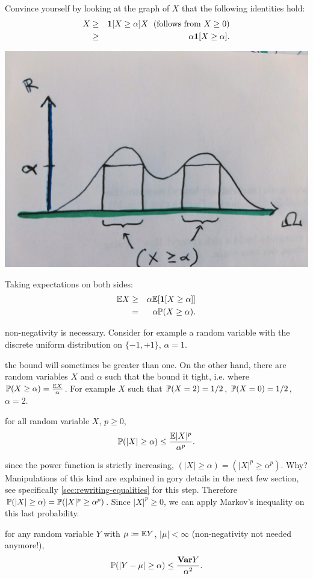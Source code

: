 \documentclass{article}
\begin{document}
 Convince yourself by looking at the graph of $X$ that the following identities hold: 
\begin{eqnarray*} 
X &\ge& \1[X \ge \alpha] X\;\text{ (follows from }X \ge 0\text{)} \\
&\ge& \alpha \1[X \ge \alpha].
\end{eqnarray*}
\begin{center}
	\includegraphics[width=0.5\linewidth]{figures/markov}
\end{center}
Taking expectations on both sides:
\begin{eqnarray*}
\E X &\ge& \alpha \E[\1[X \ge \alpha]] \\
&=& \alpha \P(X \ge \alpha).
\end{eqnarray*}

 non-negativity is necessary. Consider for example a random variable with the discrete uniform distribution on $\{-1, +1\}$, $\alpha = 1$.  

 the bound will sometimes be greater than one. On the other hand, there are random variables $X$ and $\alpha$ such that the bound it tight, i.e. where $\P( X \ge \alpha) = \frac{\E X}{\alpha}$. For example $X$ such that $\P(X = 2) = 1/2$, $\P(X = 0) = 1/2$, $\alpha = 2$.

 for all random variable $X$, $p \ge 0$,
\[ \P(|X| \ge \alpha) \le \frac{\E |X|^p}{\alpha^p}. \]

 since the power function is strictly increasing, $(|X| \ge \alpha) = (|X|^p \ge \alpha^p)$. Why? Manipulations of this kind are explained in gory details in the next few section, see specifically \ref{sec:rewriting-equalities} for this step. Therefore $\P(|X| \ge \alpha) = \P(|X|^p \ge \alpha^p)$. Since $|X|^p \ge 0$, we can apply Markov's inequality on this last probability.


 for any random variable $Y$ with $\mu \defeq \E Y$, $|\mu| < \infty$ (non-negativity not needed anymore!),
\[ \P(|Y - \mu| \ge \alpha) \le \frac{\var Y}{\alpha^2}. \]
\end{document}
